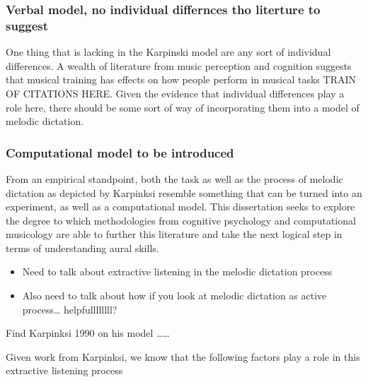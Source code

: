 \documentclass[]{book}
\providecommand{\tightlist}{%
  \setlength{\itemsep}{0pt}\setlength{\parskip}{0pt}}
\theoremstyle{definition}
\theoremstyle{definition}
\theoremstyle{definition}
\theoremstyle{remark}
\begin{document}
\hypertarget{verbal-model-no-individual-differnces-tho-literture-to-suggest}{%
\subsubsection{Verbal model, no individual differnces tho literture to
suggest}\label{verbal-model-no-individual-differnces-tho-literture-to-suggest}}

One thing that is lacking in the Karpinski model are any sort of
individual differences. A wealth of literature from music perception and
cognition suggests that musical training has effects on how people
perform in musical tasks TRAIN OF CITATIONS HERE. Given the evidence
that individual differences play a role here, there should be some sort
of way of incorporating them into a model of melodic dictation.

\hypertarget{computational-model-to-be-introduced}{%
\subsubsection{Computational model to be
introduced}\label{computational-model-to-be-introduced}}

From an empirical standpoint, both the task as well as the process of
melodic dictation as depicted by Karpinksi resemble something that can
be turned into an experiment, as well as a computational model. This
dissertation seeks to explore the degree to which methodologies from
cognitive psychology and computational musicology are able to further
this literature and take the next logical step in terms of understanding
aural skills.

\begin{itemize}
\tightlist
\item
  Need to talk about extractive listening in the melodic dictation
  process
\item
  Also need to talk about how if you look at melodic dictation as active
  process\ldots{} helpfullllllll?
\end{itemize}

Find Karpinksi 1990 on his model \ldots{}\ldots{}

Given work from Karpinksi, we know that the following factors play a
role in this extractive listening process
\end{document}
